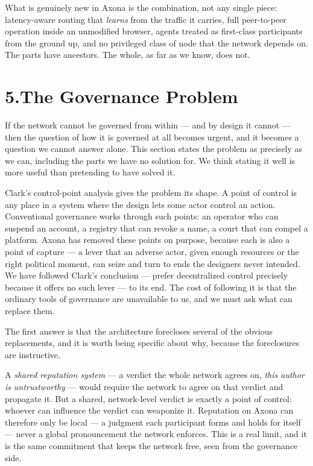 \documentclass[nobib,justified]{tufte-handout}
\begin{document}
What is genuinely new in Axona is the combination, not any single piece:
latency-aware routing that \emph{learns} from the traffic it carries, full
peer-to-peer operation inside an unmodified browser, agents treated as
first-class participants from the ground up, and no privileged class of node that
the network depends on. The parts have ancestors. The whole, as far as we know,
does not.

\section{5.\quad The Governance Problem}

If the network cannot be governed from within --- and by design it cannot ---
then the question of how it is governed at all becomes urgent, and it becomes a
question we cannot answer alone. This section states the problem as precisely as
we can, including the parts we have no solution for. We think stating it well is
more useful than pretending to have solved it.

Clark's control-point analysis gives the problem its shape. A point of control is
any place in a system where the design lets some actor control an action.
Conventional governance works through such points: an operator who can suspend an
account, a registry that can revoke a name, a court that can compel a platform.
Axona has removed these points on purpose, because each is also a point of
capture --- a lever that an adverse actor, given enough resources or the right
political moment, can seize and turn to ends the designers never intended. We have
followed Clark's conclusion --- prefer decentralized control precisely because it
offers no such lever --- to its end. The cost of following it is that the ordinary
tools of governance are unavailable to us, and we must ask what can replace them.

The first answer is that the architecture forecloses several of the
obvious replacements, and it is worth being specific about why, because the
foreclosures are instructive.

A \emph{shared reputation system} --- a verdict the whole network agrees on,
\emph{this author is untrustworthy} --- would require the network to agree on that
verdict and propagate it. But a shared, network-level verdict is exactly a point
of control: whoever can influence the verdict can weaponize it. Reputation on
Axona can therefore only be local --- a judgment each participant forms and holds
for itself --- never a global pronouncement the network enforces. This is a real
limit, and it is the same commitment that keeps the network free, seen from the
governance side.
\end{document}
